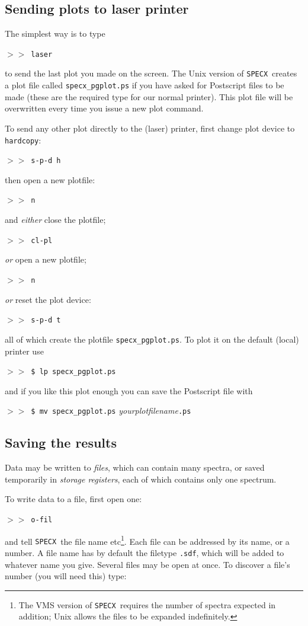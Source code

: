 \documentclass[11pt,twoside]{article}
\newcommand{\SPECX}{{\tt SPECX}}
\newcommand{\margnote}[1]
{\marginpar{({\it{\ref{#1}}})}}
\newcommand{\SP}{{$>\!>$}}
\begin{document}
\subsection{Sending plots to laser printer}
The \margnote{sec:specx_12} simplest way is to type

\SP\ {\tt{laser}}

to send the last plot you made on the screen. The Unix version of
\SPECX\ creates a plot file called \verb|specx_pgplot.ps| if you have
asked for Postscript files to be made (these are the required type for
our normal printer). This plot file will be overwritten every time you
issue a new plot command.

To send any other plot directly to the (laser) printer, first change plot
device to {\tt{hardcopy}}:

\SP\ {\tt{s-p-d h}}

then open a new plotfile:

\SP\ {\tt{n}}

and {\it{either}} close the plotfile;

\SP\ {\tt{cl-pl}}

{\it or} open a new plotfile;

\SP\ {\tt{n}}

{\it{or}} reset the plot device:

\SP\ {\tt{s-p-d t}}

all of which create the plotfile \verb|specx_pgplot.ps|.
To plot it on the default (local) printer use

\SP\ \verb|$ lp specx_pgplot.ps|

and if you like this plot enough you can save the Postscript file with

\SP\ \verb|$ mv specx_pgplot.ps| {\it{yourplotfilename}}{\tt{.ps}}

\normalmarginpar
\subsection{Saving the results}
Data may be written to {\it{files}}, which can contain many spectra, or
saved temporarily in {\it{storage registers}}, each of which contains
only one spectrum.

To write data to a file, first open one\margnote{sec:data-files}:

\SP\ {\tt{o-fil}}

and tell \SPECX\ the file name etc\footnote{The VMS version of \SPECX\
requires the number of spectra expected in addition; Unix allows the
files to be expanded indefinitely.}. Each file can be addressed by its
name, or a number. A file name has by default the filetype {\tt{.sdf}},
which will be added to whatever name you give. Several files may be
open at once. To discover a file's number (you will need this) type:
\end{document}
